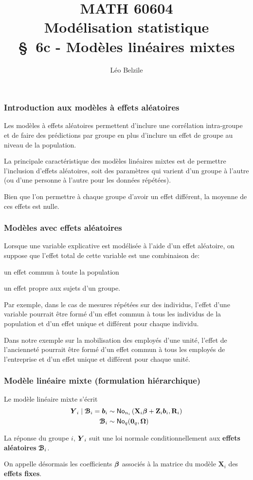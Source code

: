 \documentclass{beamer}
\title[\color{white}{MATH 60604 \S~6c - Modèles linéaires mixtes}]{\texorpdfstring{MATH 60604 \\Modélisation statistique \\ \S~6c - Modèles linéaires mixtes}{MATH 60604 \\Modélisation statistique \\ \S~6c - Modèles linéaires mixtes}}
\author{Léo Belzile}
\institute{HEC Montréal\\
Département de sciences de la décision}
\date{}
\begin{document}
\frame{\titlepage}

\begin{frame}
\frametitle{Introduction aux modèles à effets aléatoires}
Les modèles à effets aléatoires permettent d'inclure une corrélation intra-groupe et de faire des prédictions par groupe en plus d'inclure un effet de groupe au niveau de la population.
\bi \item La principale caractéristique des \alert{modèles linéaires mixtes} est de permettre l'inclusion d'\alert{effets aléatoires},  soit des paramètres qui varient d'un groupe à l'autre (ou d'une personne à l'autre pour les données répétées).
\item Bien que l'on permettre à chaque groupe d'avoir un effet différent, la moyenne de ces effets est nulle.
\ei
\end{frame}

\begin{frame}[fragile]
\frametitle{Modèles avec effets aléatoires}
\bi
\item Lorsque une variable explicative est modélisée à l'aide d'un effet aléatoire, on suppose que \alert{l'effet total de cette variable est une combinaison de}:
\be
\item un \alert{effet commun à toute la population}
\item un \alert{effet propre aux sujets d'un groupe}.
\ee
\item Par exemple, dans le cas de mesures répétées sur des individus, l'effet d'une variable pourrait être formé d'un effet commun à tous les individus de la population et d'un effet unique et différent pour chaque individu.
\item Dans notre exemple sur la mobilisation des employés d'une unité, l'effet de l'ancienneté pourrait être formé d'un effet commun à tous les employés de l'entreprise et d'un effet unique et différent pour chaque unité.
\ei
\end{frame}

\begin{frame}
 \frametitle{Modèle linéaire mixte (formulation hiérarchique)}
Le modèle linéaire mixte s'écrit
 \begin{align*}
  \boldsymbol {Y}_i \mid \boldsymbol {\mathcal{B}}_i =\boldsymbol {b}_i &\sim \mathsf{No}_{n_i}\left( \mathbf{X}_i \boldsymbol {\beta} + \mathbf{Z}_i\boldsymbol {b}_i, \mathbf{R}_i\right) \\
  \boldsymbol {\mathcal{B}}_i & \sim \mathsf{No}_{q}( \boldsymbol {0}_q, \boldsymbol {\Omega})
 \end{align*}

 \bi \item 
 La réponse du groupe $i$, $\boldsymbol {Y}_i$ suit une loi normale conditionnellement aux \textbf{effets aléatoires} $  \boldsymbol {\mathcal{B}}_i$.
 \item 
On appelle désormais les coefficients $\boldsymbol {\beta}$ associés à la matrice du modèle $\mathbf{X}_i$ des \textbf{effets fixes}.
 \ei 
\end{frame}
\end{document}
